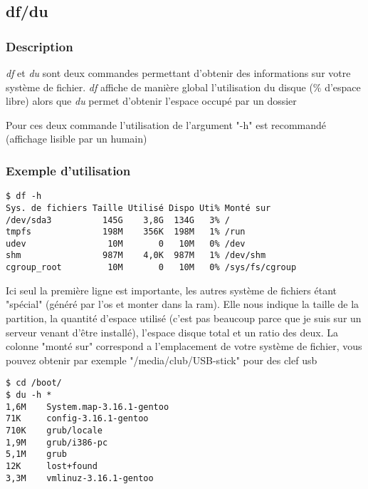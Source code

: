 \subsection*{df/du}
\subsubsection*{Description}
\emph{df} et \emph{du} sont deux commandes permettant d'obtenir des informations sur votre système de fichier.
\emph{df} affiche de manière global l'utilisation du disque (\% d'espace libre) alors que \emph{du} permet d'obtenir l'espace occupé par un dossier

\noindent Pour ces deux commande l'utilisation de l'argument "-h" est recommandé (affichage lisible par un humain)

\subsubsection*{Exemple d'utilisation}

\begin{lstlisting}
$ df -h
Sys. de fichiers Taille Utilisé Dispo Uti% Monté sur
/dev/sda3          145G    3,8G  134G   3% /
tmpfs              198M    356K  198M   1% /run
udev                10M       0   10M   0% /dev
shm                987M    4,0K  987M   1% /dev/shm
cgroup_root         10M       0   10M   0% /sys/fs/cgroup
\end{lstlisting}

Ici seul la première ligne est importante, les autres système de fichiers étant "spécial" (généré par l'os et monter dans la ram).
Elle nous indique la taille de la partition, la quantité d'espace utilisé (c'est pas beaucoup parce que je suis sur un serveur venant d'être installé), l'espace disque total et un ratio des deux.
La colonne "monté sur" correspond a l'emplacement de votre système de fichier, vous pouvez obtenir par exemple "/media/club/USB-stick" pour des clef usb

\begin{lstlisting}
$ cd /boot/
$ du -h *
1,6M    System.map-3.16.1-gentoo
71K     config-3.16.1-gentoo
710K    grub/locale
1,9M    grub/i386-pc
5,1M    grub
12K     lost+found
3,3M    vmlinuz-3.16.1-gentoo
\end{lstlisting}

